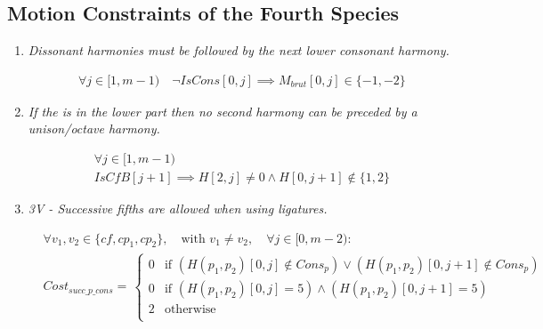 \subsection*{Motion Constraints of the Fourth Species}
\begin{enumerate}[wide, label=\bfseries 4.P\arabic*]
  \item\label{rule:dissolved} {\textit{Dissonant harmonies must be followed by the next lower consonant harmony.}}

\begin{equation}
    \begin{gathered}
        \forall j \in [1, m-1) \quad
        \lnot IsCons[0, j] \implies M_{brut}[0, j] \in \{-1, -2\}
    \end{gathered}
\end{equation}

\item\label{rule:nosecond} {\textit{If the \cfs is in the lower part then no second harmony can be preceded by a unison/octave harmony.}}

\begin{equation}
    \begin{gathered}
        \forall j \in [1, m-1)\\
        \mathit{IsCfB}[j+1] \implies H[2, j] \neq 0 \land H[0, j+1] \notin \{1, 2\}
    \end{gathered}
\end{equation}

\item \textit{3V - Successive fifths are allowed when using ligatures.}    

    \begin{equation} \begin{aligned}
        &\forall v_1, v_2 \in \{cf, cp_1, cp_2\}, \quad \text{with } v_1 \neq v_2, \quad \forall j \in [0, m-2) \colon\\
        &Cost_{succ\_p\_cons} = \,  
        \begin{cases}
            0 & \text{if } (H(p_1, p_2)[0, j] \notin Cons_p) \lor (H(p_1, p_2)[0, j+1] \notin Cons_p)\\
            0 & \text{if } (H(p_1, p_2)[0, j] = 5 ) \land (H(p_1, p_2)[0, j+1] = 5) \\
            2 & \text{otherwise } \\
        \end{cases}\\
    \end{aligned} \end{equation}



\end{enumerate}
